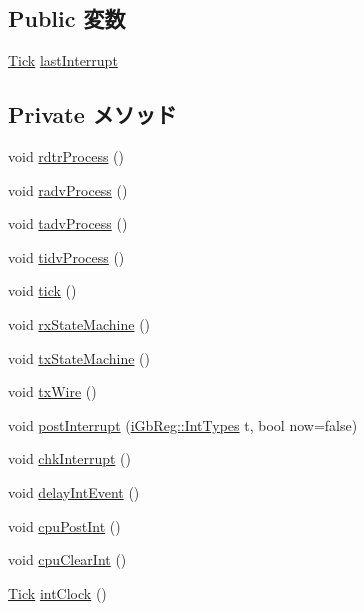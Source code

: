 \subsection*{Public 変数}
\begin{DoxyCompactItemize}
\item 
\hyperlink{base_2types_8hh_a5c8ed81b7d238c9083e1037ba6d61643}{Tick} \hyperlink{classIGbE_adad52012a21d414368149556f2cc909b}{lastInterrupt}
\end{DoxyCompactItemize}
\subsection*{Private メソッド}
\begin{DoxyCompactItemize}
\item 
void \hyperlink{classIGbE_a047d922eba10484b3a0127faa8e1be0a}{rdtrProcess} ()
\item 
void \hyperlink{classIGbE_a1d54e26efe0f0a1fbd354ccffa34459f}{radvProcess} ()
\item 
void \hyperlink{classIGbE_a7e3216d8f11c9d6c3fa244be21648778}{tadvProcess} ()
\item 
void \hyperlink{classIGbE_aedc70a3ef5f173813e3060f77fa53bc8}{tidvProcess} ()
\item 
void \hyperlink{classIGbE_a873dd91783f9efb4a590aded1f70d6b0}{tick} ()
\item 
void \hyperlink{classIGbE_aa22f1272cbc1c6b44dd50faaa71a0d87}{rxStateMachine} ()
\item 
void \hyperlink{classIGbE_a86f1c8a72188e638c991535ba96f5f0e}{txStateMachine} ()
\item 
void \hyperlink{classIGbE_af67ff1365c83adc97fef8753e38f3d9e}{txWire} ()
\item 
void \hyperlink{classIGbE_a5421bafb8503ffca04cac20d616ae4cc}{postInterrupt} (\hyperlink{namespaceiGbReg_ab881f740bd3545d8eb42b05253752e9c}{iGbReg::IntTypes} t, bool now=false)
\item 
void \hyperlink{classIGbE_a29bfbbe58f3015bfb026c019295a8836}{chkInterrupt} ()
\item 
void \hyperlink{classIGbE_a671c460437037741ca81581773939a28}{delayIntEvent} ()
\item 
void \hyperlink{classIGbE_a6cc0f5948b3dc7c1f2e489bce23ef907}{cpuPostInt} ()
\item 
void \hyperlink{classIGbE_a5bb6e41ae1497d53a611db0a6b455115}{cpuClearInt} ()
\item 
\hyperlink{base_2types_8hh_a5c8ed81b7d238c9083e1037ba6d61643}{Tick} \hyperlink{classIGbE_ad4b9fb8ece2ddee6cda2b12e4f77b3d1}{intClock} ()

\end{DoxyCompactItemize}
